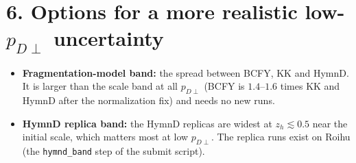 \documentclass[12pt]{article}
\begin{document}
\section*{6. Options for a more realistic low-$p_{D\perp}$ uncertainty}

\begin{itemize}
\item \textbf{Fragmentation-model band:} the spread between BCFY, KK and HymnD. It is larger than
  the scale band at all $p_{D\perp}$ (BCFY is $1.4$--$1.6$ times KK and HymnD after the
  normalization fix) and needs no new runs.
\item \textbf{HymnD replica band:} the HymnD replicas are widest at $z_h\lesssim0.5$ near the
  initial scale, which matters most at low $p_{D\perp}$. The replica runs exist on Roihu (the
  \texttt{hymnd\_band} step of the submit script).
\end{itemize}
\end{document}
